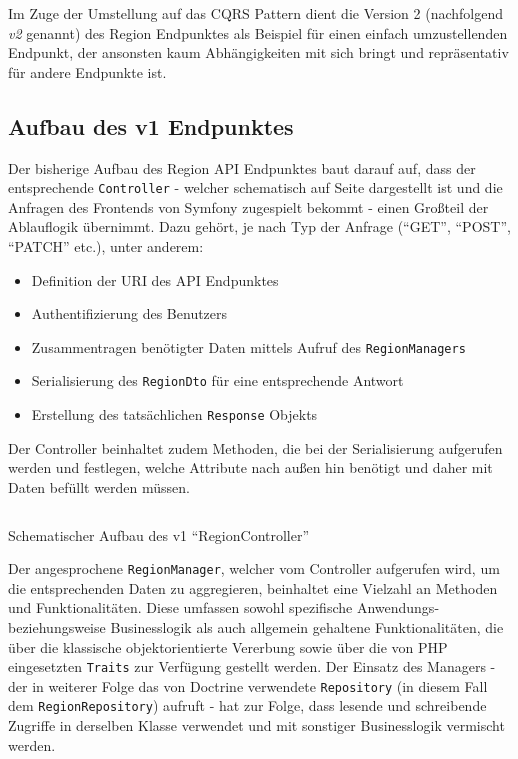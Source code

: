 \documentclass[a4paper,12pt,twoside]{scrreprt}
\begin{document}
\smallskip

Im Zuge der Umstellung auf das CQRS Pattern dient die Version 2 (nachfolgend \textit{v2} genannt) des Region Endpunktes als Beispiel für einen einfach umzustellenden Endpunkt, der ansonsten kaum Abhängigkeiten mit sich bringt und repräsentativ für andere Endpunkte ist.

\subsection{Aufbau des v1 Endpunktes}
\label{sub-sec:region-aufbau-v1}
Der bisherige Aufbau des Region API Endpunktes baut darauf auf, dass der entsprechende \texttt{Controller} - welcher schematisch auf Seite \pageref{code:region-controller-v1} dargestellt ist und die Anfragen des Frontends von Symfony zugespielt bekommt - einen Großteil der Ablauflogik übernimmt. Dazu gehört, je nach Typ der Anfrage (\enquote{GET}, \enquote{POST}, \enquote{PATCH} etc.), unter anderem:

\begin{itemize}
    \item Definition der URI des API Endpunktes
    \item Authentifizierung des Benutzers
    \item Zusammentragen benötigter Daten mittels Aufruf des \texttt{RegionManagers}
    \item Serialisierung des \texttt{RegionDto} für eine entsprechende Antwort
    \item Erstellung des tatsächlichen \texttt{Response} Objekts
\end{itemize}

\noindent Der Controller beinhaltet zudem Methoden, die bei der Serialisierung aufgerufen werden und festlegen, welche Attribute nach außen hin benötigt und daher mit Daten befüllt werden müssen.

\begin{listing}[ht]
    \inputminted[fontsize=\footnotesize,linenos,breaklines]{php}{code/region_controller_v1.php}
    \caption[Schematischer Aufbau des v1 \enquote{RegionController}]{Schematischer Aufbau des v1 \enquote{RegionController}}
    \label{code:region-controller-v1}
\end{listing}

\smallskip

Der angesprochene \texttt{RegionManager}, welcher vom Controller aufgerufen wird, um die entsprechenden Daten zu aggregieren, beinhaltet eine Vielzahl an Methoden und Funktionalitäten. Diese umfassen sowohl spezifische Anwendungs- beziehungsweise Businesslogik als auch allgemein gehaltene Funktionalitäten, die über die klassische objektorientierte Vererbung sowie über die von PHP eingesetzten \texttt{Traits} zur Verfügung gestellt werden. Der Einsatz des Managers - der in weiterer Folge das von Doctrine verwendete \texttt{Repository} (in diesem Fall dem \texttt{RegionRepository}) aufruft - hat zur Folge, dass lesende und schreibende Zugriffe in derselben Klasse verwendet und mit sonstiger Businesslogik vermischt werden.
\end{document}
